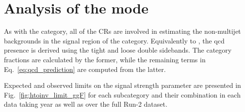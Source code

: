 

\section{Analysis of the \texorpdfstring{\ggH}{ggH} mode}
\label{sec:htoinv_analysis_ggF}

As with the \VH category, all of the \glspl{CR} are involved in estimating the non-multijet backgrounds in the signal region of the \ggF category. Equivalently to \ttH, the \acrshort{qcd} presence is derived using the tight and loose double sidebands. The category fractions \catFraction are calculated by the former, while the remaining terms in Eq.~\ref{eq:qcd_prediction} are computed from the latter.

Expected and observed limits on the signal strength parameter are presented in Fig.~\ref{fig:htoinv_limit_ggF} for each \ggF subcategory and their combination in each data taking year as well as over the full Run-2 dataset.

